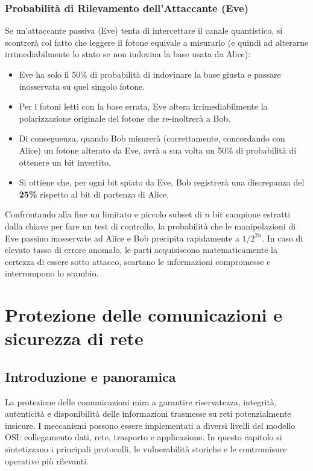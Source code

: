 \documentclass[12pt, a4paper]{report}
\begin{document}
\subsection{Probabilità di Rilevamento dell'Attaccante (Eve)}
Se un'attaccante passiva (Eve) tenta di intercettare il canale quantistico, si scontrerà col fatto che leggere il fotone equivale a misurarlo (e quindi ad alterarne irrimediabilmente lo stato se non indovina la base usata da Alice):
\begin{itemize}
	\item Eve ha solo il 50\% di probabilità di indovinare la base giusta e passare inosservata su quel singolo fotone.
	\item Per i fotoni letti con la base errata, Eve altera irrimediabilmente la polarizzazione originale del fotone che re-inoltrerà a Bob.
	\item Di conseguenza, quando Bob misurerà (correttamente, concordando con Alice) un fotone alterato da Eve, avrà a sua volta un 50\% di probabilità di ottenere un bit invertito.
	\item Si ottiene che, per ogni bit spiato da Eve, Bob registrerà una discrepanza del \textbf{25\%} rispetto al bit di partenza di Alice.
\end{itemize}

Confrontando alla fine un limitato e piccolo subset di $n$ bit campione estratti dalla chiave per fare un test di controllo, la probabilità che le manipolazioni di Eve passino inosservate ad Alice e Bob precipita rapidamente a $1/2^{2n}$. In caso di elevato tasso di errore anomalo, le parti acquisiscono matematicamente la certezza di essere sotto attacco, scartano le informazioni compromesse e interrompono lo scambio.

\chapter{Protezione delle comunicazioni e sicurezza di rete}
\label{ch:protezione-comunicazioni}

\section{Introduzione e panoramica}
La protezione delle comunicazioni mira a garantire riservatezza, integrit\`a, autenticit\`a e disponibilit\`a delle informazioni trasmesse su reti potenzialmente insicure. I meccanismi possono essere implementati a diversi livelli del modello OSI: collegamento dati, rete, trasporto e applicazione. In questo capitolo si sintetizzano i principali protocolli, le vulnerabilit\`a storiche e le contromisure operative pi\`u rilevanti.
\end{document}
